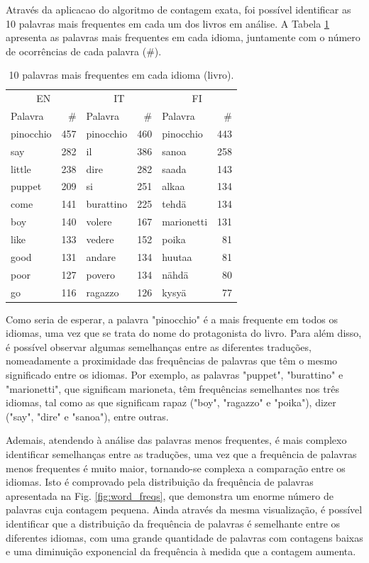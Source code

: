 \documentclass[mirror, portugues]{revdetua}
\begin{document}
Através da aplicacao do algoritmo de contagem exata, foi possível identificar as 10 palavras mais frequentes em cada um dos livros em análise. A Tabela \ref{table:top10_exatos} apresenta as palavras mais frequentes em cada idioma, juntamente com o número de ocorrências de cada palavra (\#).

\begin{table}[H]
\centering
\caption{10 palavras mais frequentes em cada idioma (livro).}
\label{table:top10_exatos}
\begin{tabular}{lr|lr|lr}
\toprule
\multicolumn{2}{c}{EN} & \multicolumn{2}{c}{IT} & \multicolumn{2}{c}{FI} \\
Palavra & \# & Palavra & \# & Palavra & \# \\
\midrule
pinocchio & 457 & pinocchio & 460 & pinocchio & 443 \\
say & 282 & il & 386 & sanoa & 258 \\
little & 238 & dire & 282 & saada & 143 \\
puppet & 209 & si & 251 & alkaa & 134 \\
come & 141 & burattino & 225 & tehdä & 134 \\
boy & 140 & volere & 167 & marionetti & 131 \\
like & 133 & vedere & 152 & poika & 81 \\
good & 131 & andare & 134 & huutaa & 81 \\
poor & 127 & povero & 134 & nähdä & 80 \\
go & 116 & ragazzo & 126 & kysyä & 77 \\
\bottomrule
\end{tabular}
\end{table}

Como seria de esperar, a palavra "pinocchio" é a mais frequente em todos os idiomas, uma vez que se trata do nome do protagonista do livro. Para além disso, é possível observar algumas semelhanças entre as diferentes traduções, nomeadamente a proximidade das frequências de palavras que têm o mesmo significado entre os idiomas. Por exemplo, as palavras "puppet", "burattino" e "marionetti", que significam marioneta, têm frequências semelhantes nos três idiomas, tal como as que significam rapaz ("boy", "ragazzo" e "poika"), dizer ("say", "dire" e "sanoa"), entre outras.

Ademais, atendendo à análise das palavras menos frequentes, é mais complexo identificar semelhanças entre as traduções, uma vez que a frequência de palavras menos frequentes é muito maior, tornando-se complexa a comparação entre os idiomas. Isto é comprovado pela distribuição da frequência de palavras apresentada na Fig. \ref{fig:word_freqs}, que demonstra um enorme número de palavras cuja contagem pequena. Ainda através da mesma visualização, é possível identificar que a distribuição da frequência de palavras é semelhante entre os diferentes idiomas, com uma grande quantidade de palavras com contagens baixas e uma diminuição exponencial da frequência à medida que a contagem aumenta.
\end{document}
